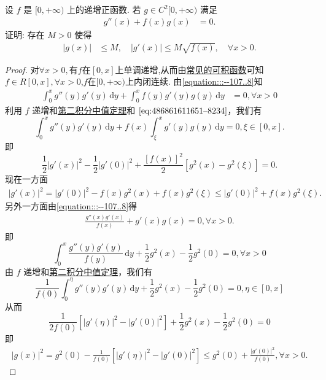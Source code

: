 \documentclass[../../main.tex]{subfiles}%
\begin{document}
\begin{example}
设 \( f \) 是 \( [0,+\infty) \) 上的递增正函数. 若 \( g \in C^2[0,+\infty) \) 满足
\begin{align}
g''(x) + f(x)g(x) &= 0.\label{equation:::--107..8}
\end{align}
证明: 存在 \( M > 0 \) 使得
\begin{align}
|g(x)| &\leqslant M, \quad |g'(x)| \leqslant M\sqrt{f(x)}, \quad \forall x > 0.\label{equation:::--107..9}
\end{align}
\end{example}
\begin{proof}
对$\forall x>0,$有$f$在$[0,x]$上单调递增,从而由\hyperref[proposition:常见的可积函数]{常见的可积函数}可知$f\in R[0,x],\forall x>0$,$f$在$[0,+\infty)$上内闭连续.
由\eqref{equation:::--107..8}知
\begin{align}
\int_0^x g''(y)g'(y)\,\mathrm{d}y + \int_0^x f(y)g'(y)g(y)\,\mathrm{d}y &= 0, \forall x > 0 \label{eq:486861611651--8234}
\end{align}
利用 \( f \) 递增和\hyperref[theorem:积分中值定理(2)]{第二积分中值定理}和 \(\eqref{eq:486861611651--8234}\)，我们有
\[
\int_0^x g''(y)g'(y)\,\mathrm{d}y + f(x)\int_\xi^x g'(y)g(y)\,\mathrm{d}y = 0, \xi \in [0, x].
\]
即
\[
\frac{1}{2}\lvert g'(x)\rvert^2 - \frac{1}{2}\lvert g'(0)\rvert^2 + \frac{[f(x)]^2}{2}\left[g^2(x) - g^2(\xi)\right] = 0.
\]
现在一方面
\begin{align}
\lvert g'(x)\rvert^2 = \lvert g'(0)\rvert^2 - f(x)g^2(x) + f(x)g^2(\xi) \leqslant \lvert g'(0)\rvert^2 + f(x)g^2(\xi).\label{eq:::--123124523-1214} 
\end{align}
另外一方面由\eqref{equation:::--107..8}得
\begin{align*}
\frac{g''(x)g'(x)}{f(x)} + g'(x)g(x) = 0, \forall x > 0. 
\end{align*}
即
\[
\int_0^x \frac{g''(y)g'(y)}{f(y)}\,\mathrm{d}y + \frac{1}{2}g^2(x) - \frac{1}{2}g^2(0) = 0, \forall x > 0
\]
由 \( f \) 递增和\hyperref[theorem:积分中值定理(1)]{第二积分中值定理}，我们有
\[
\frac{1}{f(0)}\int_0^\eta g''(y)g'(y)\,\mathrm{d}y + \frac{1}{2}g^2(x) - \frac{1}{2}g^2(0) = 0, \eta \in [0, x]
\]
从而
\[
\frac{1}{2f(0)}\left[\lvert g'(\eta)\rvert^2 - \lvert g'(0)\rvert^2\right] + \frac{1}{2}g^2(x) - \frac{1}{2}g^2(0) = 0
\]
即
\begin{align}
\lvert g(x)\rvert^2 = g^2(0) - \frac{1}{f(0)}\left[\lvert g'(\eta)\rvert^2 - \lvert g'(0)\rvert^2\right] \leqslant g^2(0) + \frac{\lvert g'(0)\rvert^2}{f(0)},\forall x>0.\label{eq:::--123124523-1211}
\end{align}

\end{proof}
\end{document}
